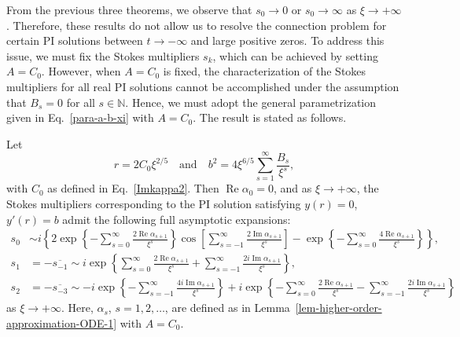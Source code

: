 \documentclass[12pt]{article}
\theoremstyle{plain}
\newtheorem{theorem}{\hskip\parindent Theorem}
\theoremstyle{definition}
\numberwithin{equation}{section}
\renewcommand\Re{\operatorname{Re}}
\renewcommand\Im{\operatorname{Im}}
\begin{document}
From the previous three theorems, we observe that \( s_{0} \to 0 \) or \( s_{0} \to \infty \) as \( \xi \to +\infty \). Therefore, these results do not allow us to resolve the connection problem for certain PI solutions between \( t \to -\infty \) and large positive zeros. To address this issue, we must fix the Stokes multipliers \( s_{k} \), which can be achieved by setting \( A = C_{0} \).
However, when \( A = C_{0} \) is fixed, the characterization of the Stokes multipliers for all real PI solutions cannot be accomplished under the assumption that \( B_{s} = 0 \) for all \( s \in \mathbb{N}\). Hence, we must adopt the general parametrization given in Eq.~\eqref{para-a-b-xi} with \( A = C_{0} \).
The result is stated as follows.

\begin{theorem}\label{Thm-stokes-case-IV}
Let
\[
r = 2C_{0}\xi^{2/5} \quad\text{and}\quad
b^2 = 4\xi^{6/5} \sum_{s=1}^{\infty} \frac{B_{s}}{\xi^{s}},
\]
with \( C_{0} \) as defined in Eq.~\eqref{Imkappa2}.
Then \( \Re \alpha_{0} = 0 \), and as \( \xi \to +\infty \), the Stokes multipliers corresponding to the PI solution satisfying \( y(r) = 0 \), \( y'(r) = b \) admit the following full asymptotic expansions:
\begin{equation}
\label{eq-stokes-full-asymptotic-case-IV}
\begin{split}
s_{0}&\sim i\left\{2\exp\left\{-\sum\limits_{s=0}^{\infty}\frac{2\Re\alpha_{s+1}}{\xi^{s}}\right\}\cos{\left[\sum\limits_{s=-1}^{\infty}\frac{2\Im\alpha_{s+1}}{\xi^{s}}\right]}-\exp\left\{-\sum\limits_{s=0}^{\infty}\frac{4\Re\alpha_{s+1}}{\xi^{s}}\right\}\right\},\\
s_{1}&=-\overline{s_{-1}}\sim i\exp\left\{\sum\limits_{s=0}^{\infty}\frac{2\Re\alpha_{s+1}}{\xi^{s}}+\sum\limits_{s=-1}^{\infty}\frac{2i\Im\alpha_{s+1}}{\xi^{s}}\right\},\\
s_{2}&=-\overline{s_{-3}}\sim -i\exp\left\{-\sum\limits_{s=-1}^{\infty}\frac{4i\Im\alpha_{s+1}}{\xi^{s}}\right\}+i\exp\left\{-\sum\limits_{s=0}^{\infty}\frac{2\Re\alpha_{s+1}}{\xi^{s}}-\sum\limits_{s=-1}^{\infty}\frac{2i\Im\alpha_{s+1}}{\xi^{s}}\right\}
\end{split}
\end{equation}
as $\xi\to+\infty$. Here, $\alpha_{s}$, $s=1,2,\dots$, are defined as in Lemma~\ref{lem-higher-order-approximation-ODE-1} with $A=C_{0}$.
\end{theorem}
\end{document}

